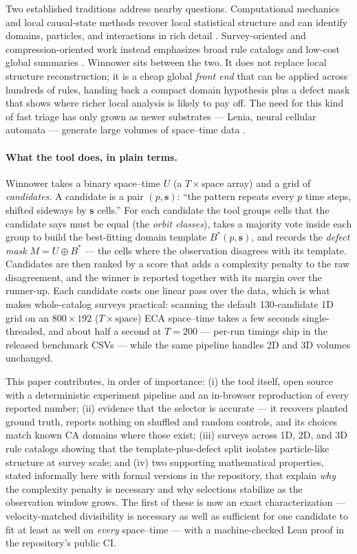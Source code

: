 \documentclass[letterpaper]{article}
\newcommand{\bs}{\mathbf{s}}
\begin{document}
Two established traditions address nearby questions. Computational
mechanics and local causal-state methods recover local statistical
structure and can identify domains, particles, and interactions in rich
detail \citep{crutchfield1997,hanson1992,shalizi2006,lizier2008,rupe2018,rupe2019}.
Survey-oriented and compression-oriented work instead emphasizes broad
rule catalogs and low-cost global summaries
\citep{packard1985,boccara1999,zenil2010,zenil2018}. Winnower sits between the
two. It does not replace local structure reconstruction; it is a cheap
global \emph{front end} that can be applied across hundreds of rules,
handing back a compact domain hypothesis plus a defect mask that
shows where richer local analysis is likely to pay off. The need for
this kind of fast triage has only grown as newer substrates --- Lenia,
neural cellular automata --- generate large volumes of space--time data
\citep{chan2019,mordvintsev2020}.

\paragraph{What the tool does, in plain terms.}
Winnower takes a binary space--time $U$ (a $T \times \text{space}$ array)
and a grid of \emph{candidates}. A candidate is a pair $(p, \bs)$: ``the
pattern repeats every $p$ time steps, shifted sideways by $\bs$ cells.''
For each candidate the tool groups cells that the candidate says must be
equal (the \emph{orbit classes}), takes a majority vote inside each
group to build the best-fitting domain template $B^*(p,\bs)$, and records
the \emph{defect mask} $M = U \oplus B^*$ --- the cells where the
observation disagrees with its template. Candidates are then ranked by
a score that adds a complexity penalty to the raw disagreement, and the
winner is reported together with its margin over the runner-up. Each
candidate costs one linear pass over the data, which is what makes
whole-catalog surveys practical: scanning the default 130-candidate 1D
grid on an $800 \times 192$ ($T \times \text{space}$) ECA space--time
takes a few seconds single-threaded, and about half a second at
$T{=}200$ --- per-run timings ship in the released benchmark CSVs ---
while the same pipeline handles 2D and 3D volumes unchanged.

This paper contributes, in order of importance: (i) the tool itself,
open source with a deterministic experiment pipeline and an in-browser
reproduction of every reported number; (ii) evidence that the selector
is accurate --- it recovers planted ground truth, reports nothing on
shuffled and random controls, and its choices match known CA domains
where those exist; (iii) surveys across 1D, 2D, and 3D rule catalogs
showing that the template-plus-defect split isolates particle-like
structure at survey scale; and (iv) two supporting mathematical
properties, stated informally here with formal versions in the
repository, that explain \emph{why} the complexity penalty is necessary
and why selections stabilize as the observation window grows. The first
of these is now an exact characterization --- velocity-matched
divisibility is necessary as well as sufficient for one candidate to fit
at least as well on \emph{every} space--time --- with a machine-checked
Lean proof in the repository's public CI.
\end{document}
